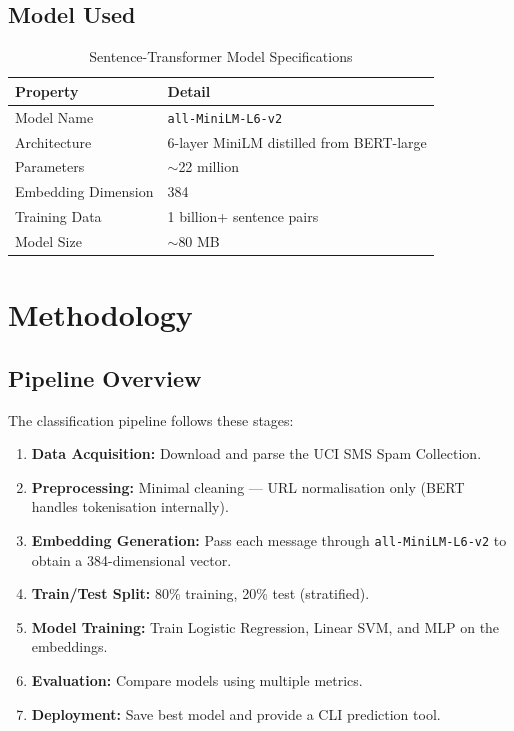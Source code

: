 \documentclass[12pt,a4paper]{article}
\begin{document}
\subsection{Model Used}
\begin{table}[H]
\centering
\renewcommand{\arraystretch}{1.3}
\begin{tabular}{|l|l|}
\hline
\textbf{Property}       & \textbf{Detail} \\
\hline
Model Name              & \texttt{all-MiniLM-L6-v2} \\
Architecture            & 6-layer MiniLM distilled from BERT-large \\
Parameters              & $\sim$22 million \\
Embedding Dimension     & 384 \\
Training Data           & 1 billion+ sentence pairs \\
Model Size              & $\sim$80 MB \\
\hline
\end{tabular}
\caption{Sentence-Transformer Model Specifications}
\end{table}

\section{Methodology}

\subsection{Pipeline Overview}
The classification pipeline follows these stages:

\begin{enumerate}[leftmargin=1.5cm]
    \item \textbf{Data Acquisition:} Download and parse the UCI SMS Spam Collection.
    \item \textbf{Preprocessing:} Minimal cleaning --- URL normalisation only (BERT handles tokenisation internally).
    \item \textbf{Embedding Generation:} Pass each message through \texttt{all-MiniLM-L6-v2} to obtain a 384-dimensional vector.
    \item \textbf{Train/Test Split:} 80\% training, 20\% test (stratified).
    \item \textbf{Model Training:} Train Logistic Regression, Linear SVM, and MLP on the embeddings.
    \item \textbf{Evaluation:} Compare models using multiple metrics.
    \item \textbf{Deployment:} Save best model and provide a CLI prediction tool.
\end{enumerate}
\end{document}
